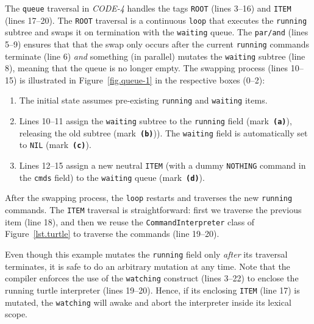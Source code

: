 \documentclass{sig-alternate}
\newcommand{\code}[1] {{\small{\texttt{#1}}}}
\newcommand{\MM}[1] {{\textbf{\texttt{#1}}}}
\begin{document}
The \code{queue} traversal in \emph{CODE-4} handles the tags \code{ROOT} (lines 
3--16) and \code{ITEM} (lines 17--20).
%
The \code{ROOT} traversal is a continuous \code{loop} that executes the 
\code{running} subtree and swaps it on termination with the \code{waiting} 
queue.
The \code{par/and} (lines 5--9) ensures that that the swap only occurs after 
the current \code{running} commands terminate (line 6) \emph{and} something (in 
parallel) mutates the \code{waiting} subtree (line 8), meaning that the queue 
is no longer empty.
The swapping process (lines 10--15) is illustrated in Figure~\ref{fig.queue-1} 
in the respective boxes (0--2):
%
\begin{enumerate}[start=0]
%
\item The initial state assumes pre-existing \code{running} and \code{waiting} 
items.
\item Lines 10--11 assign the \code{waiting} subtree to the \code{running} 
field (mark~\MM{(a)}), releasing the old subtree (mark~\MM{(b)})).
The \code{waiting} field is automatically set to \code{NIL} (mark~\MM{(c)}).
%
\item Lines 12--15 assign a new neutral \code{ITEM} (with a dummy 
\code{NOTHING} command in the \code{cmds} field) to the \code{waiting} queue 
(mark~\MM{(d)}).
%
\end{enumerate}
%
After the swapping process, the \code{loop} restarts and traverses the new 
\code{running} commands.
%
The \code{ITEM} traversal is straightforward:
first we traverse the previous item (line 18), and then we reuse the 
\code{CommandInterpreter} class of Figure~\ref{lst.turtle} to traverse the 
commands (line 19--20).

Even though this example mutates the \code{running} field only \emph{after} its 
traversal terminates, it is safe to do an arbitrary mutation at any time.
Note that the compiler enforces the use of the \code{watching} construct (lines 
3--22) to enclose the running turtle interpreter (lines 19--20).
Hence, if its enclosing \code{ITEM} (line 17) is mutated, the \code{watching} 
will awake and abort the interpreter inside its lexical scope.
\end{document}
